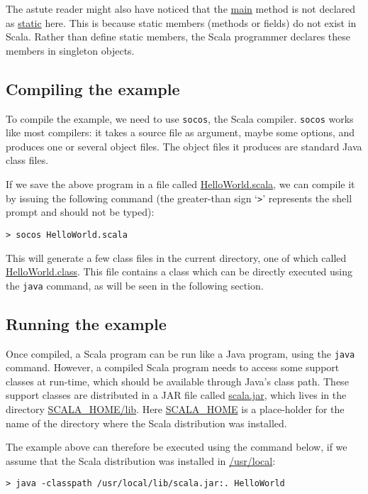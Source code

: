 \documentclass[a4paper,12pt]{article}
\newcommand{\langname}[1]{#1\xspace}
\newcommand{\Scala}{\langname{Scala}}
\newcommand{\Java}{\langname{Java}}
\newcommand{\toolname}[1]{\texttt{#1}\xspace}
\newcommand{\socos}{\toolname{socos}}
\newcommand{\java}{\toolname{java}}
\newcommand{\ident}[1]{\url{#1}\xspace}
\begin{document}
The astute reader might also have noticed that the \ident{main} method
is not declared as \ident{static} here. This is because static members
(methods or fields) do not exist in \Scala. Rather than define static
members, the \Scala programmer declares these members in singleton
objects.

\subsection{Compiling the example}
\label{sec:compiling-example}

To compile the example, we need to use \socos, the \Scala compiler.
\socos works like most compilers: it takes a source file as argument,
maybe some options, and produces one or several object files. The
object files it produces are standard \Java class files.

If we save the above program in a file called
\ident{HelloWorld.scala}, we can compile it by issuing the following
command (the greater-than sign `\verb|>|' represents the shell prompt
and should not be typed):
\begin{verbatim}
> socos HelloWorld.scala
\end{verbatim}
This will generate a few class files in the current directory, one of
which called \ident{HelloWorld.class}. This file contains a class
which can be directly executed using the \java command, as will be
seen in the following section.

\subsection{Running the example}
\label{sec:running-example}

Once compiled, a \Scala program can be run like a \Java program, using
the \java command. However, a compiled \Scala program needs to access
some support classes at run-time, which should be available through
\Java's class path. These support classes are distributed in a JAR
file called \url{scala.jar}, which lives in the directory
\url{SCALA_HOME/lib}. Here \url{SCALA_HOME} is a place-holder for the
name of the directory where the \Scala distribution was installed.

The example above can therefore be executed using the command below,
if we assume that the \Scala distribution was installed in
\url{/usr/local}:
\begin{verbatim}
> java -classpath /usr/local/lib/scala.jar:. HelloWorld
\end{verbatim}
\end{document}
